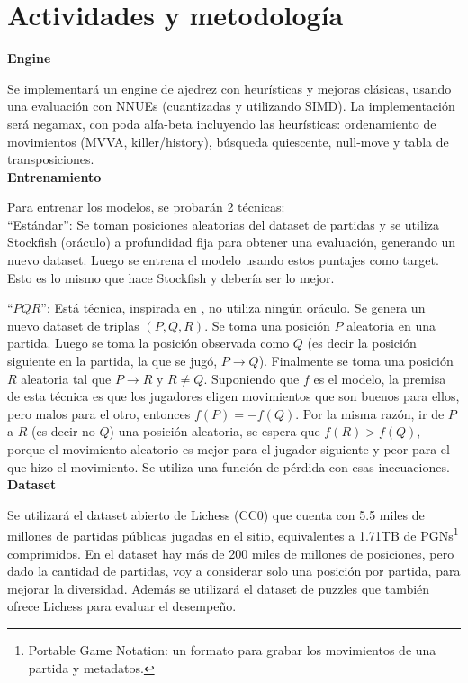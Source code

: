 \newpage
\section*{Actividades y metodología}

\textbf{Engine}

Se implementará un engine de ajedrez con heurísticas y mejoras clásicas, usando una evaluación con NNUEs (cuantizadas y utilizando SIMD). La implementación será negamax, con poda alfa-beta incluyendo las heurísticas: ordenamiento de movimientos (MVVA, killer/history), búsqueda quiescente, null-move y tabla de transposiciones. \\

\textbf{Entrenamiento}

Para entrenar los modelos, se probarán 2 técnicas: \\

``Estándar'': Se toman posiciones aleatorias del dataset de partidas y se utiliza Stockfish (oráculo) a profundidad fija para obtener una evaluación, generando un nuevo dataset. Luego se entrena el modelo usando estos puntajes como target. Esto es lo mismo que hace Stockfish y debería ser lo mejor.

``$PQR$'': Está técnica, inspirada en \cite{dlchess:2014}, no utiliza ningún oráculo. Se genera un nuevo dataset de triplas $(P,Q,R)$. Se toma una posición $P$ aleatoria en una partida. Luego se toma la posición observada como $Q$ (es decir la posición siguiente en la partida, la que se jugó, $P \rightarrow Q$). Finalmente se toma una posición $R$ aleatoria tal que $P \rightarrow R$ y $R \neq Q$. Suponiendo que $f$ es el modelo, la premisa de esta técnica es que los jugadores eligen movimientos que son buenos para ellos, pero malos para el otro, entonces $f(P)=-f(Q)$. Por la misma razón, ir de $P$ a $R$ (es decir no $Q$) una posición aleatoria, se espera que $f(R) > f(Q)$, porque el movimiento aleatorio es mejor para el jugador siguiente y peor para el que hizo el movimiento. Se utiliza una función de pérdida con esas inecuaciones. \\


\textbf{Dataset}

Se utilizará el dataset abierto de Lichess \cite{lichessdb} (CC0) que cuenta con 5.5 miles de millones de partidas públicas jugadas en el sitio, equivalentes a 1.71TB de PGNs\footnote[1]{Portable Game Notation: un formato para grabar los movimientos de una partida y metadatos.} comprimidos. En el dataset hay más de 200 miles de millones de posiciones, pero dado la cantidad de partidas, voy a considerar solo una posición por partida, para mejorar la diversidad. Además se utilizará el dataset de puzzles que también ofrece Lichess para evaluar el desempeño.

